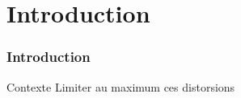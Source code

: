 \section{Introduction}
	\begin{frame}
		\frametitle{Introduction}
		\begin{block}{Contexte}
			Limiter au maximum ces distorsions
		\end{block}
\end{frame}
